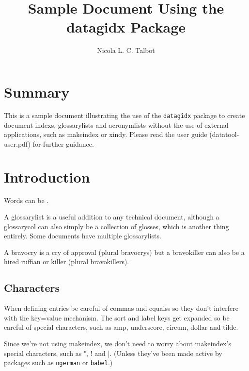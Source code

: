 \documentclass{book}
\title{Sample Document Using the datagidx Package}
\author{Nicola L. C. Talbot}
\newcommand*{\glsed}[1]{\useentry{#1}{Ed}}
\newcommand*{\glsing}[1]{\useentry{#1}{Ing}}
\begin{document}
\maketitle
\thispagestyle{empty}%

\frontmatter

\tableofcontents

\chapter{Summary}

This is a sample document illustrating the use of the
\texttt{datagidx} package to create document \glspl{index},
\glspl{glossarylist} and \glspl{acronymlist} without the use of
external \glsing{ind-index} %
applications, such as \gls{makeindex} or
\gls{xindy}. Please read the user guide (datatool-user.pdf) for
further guidance.

\mainmatter

\chapter{Introduction}

Words can be \glsed{ind-index}. %

A \gls{glossarylist} is a useful addition to any technical document,
although a \gls{glossarycol} can also simply be a collection of
glosses, which is another thing entirely. Some documents have
multiple \glspl{glossarylist}.

A \gls{bravocry} is a cry of approval (plural \glspl{bravocry}) but a 
\gls{bravokiller} can also be a hired ruffian or killer (plural
\glspl{bravokiller}).

\section{Characters}

When defining entries be careful of \glspl{comma} and \glspl{equals}
so they don't interfere with the key=value mechanism. The sort and
label keys get expanded so be careful of special characters, such as
\gls{amp}, \gls{underscore}, \gls{circum}, \gls{dollar} and \gls{tilde}.

Since we're not using \gls{makeindex}, we don't need to worry about
\gls{makeindex}'s special characters, such as \gls{"}, \gls{!} and
\gls{|}. (Unless they've been made active by packages such as
\texttt{ngerman} or \texttt{babel}.)
\end{document}
